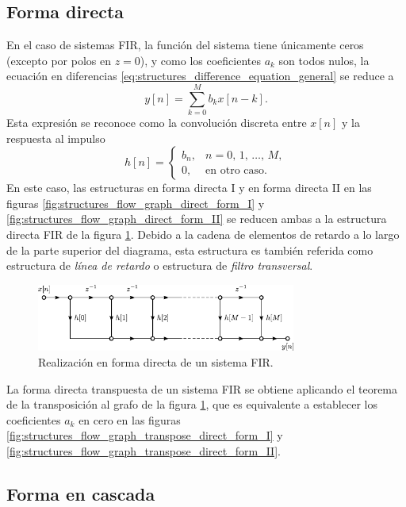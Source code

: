 \documentclass[a4paper]{report}
\begin{document}
\subsection{Forma directa}

En el caso de sistemas FIR, la función del sistema tiene únicamente ceros (excepto por polos en \(z=0\)), y como los coeficientes \(a_k\) son todos nulos, la ecuación en diferencias \ref{eq:structures_difference_equation_general} se reduce a 
\[
 y[n]=\sum_{k=0}^M b_k x[n-k].
\]
Esta expresión se reconoce como la convolución discreta entre \(x[n]\) y la respuesta al impulso
\[
 h[n]=
 \left\{
 \begin{array}{ll}
  b_n, & n=0,\,1,\,\dots,\,M,\\
  0, &\textrm{en otro caso.}
 \end{array}
 \right.
\]
En este caso, las estructuras en forma directa I y en forma directa II en las figuras \ref{fig:structures_flow_graph_direct_form_I} y \ref{fig:structures_flow_graph_direct_form_II} se reducen ambas a la estructura directa FIR de la figura \ref{fig:structures_flow_graph_direct_form_I_FIR}. Debido a la cadena de elementos de retardo a lo largo de la parte superior del diagrama, esta estructura es también referida como estructura de \emph{línea de retardo} o estructura de \emph{filtro transversal}.
\begin{figure}[!htb]
 \begin{center}
 \includegraphics[width=0.76\textwidth]{figuras/structures_flow_graph_direct_form_I_FIR.pdf}
 \caption{\label{fig:structures_flow_graph_direct_form_I_FIR} Realización en forma directa de un sistema FIR.}
 \end{center}
\end{figure}

La forma directa transpuesta de un sistema FIR se obtiene aplicando el teorema de la transposición al grafo de la figura \ref{fig:structures_flow_graph_direct_form_I_FIR}, que es equivalente a establecer los coeficientes \(a_k\) en cero en las figuras \ref{fig:structures_flow_graph_transpose_direct_form_I} y \ref{fig:structures_flow_graph_transpose_direct_form_II}.

\subsection{Forma en cascada}
\end{document}
